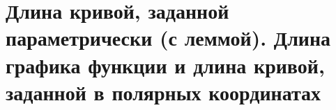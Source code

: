 \section{Длина кривой, заданной параметрически (с леммой). Длина графика функции и длина кривой, заданной в полярных координатах}

